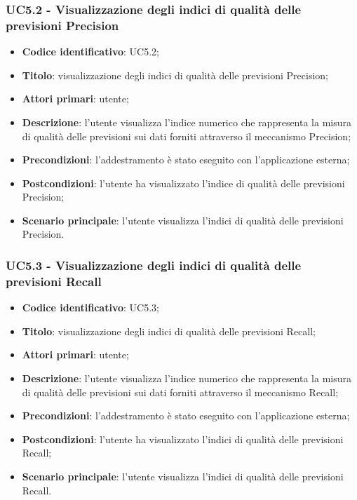 \subsubsection{UC5.2 - Visualizzazione degli indici di qualità delle previsioni Precision}
\begin{itemize}
	\item \textbf{Codice identificativo}: UC5.2;
	\item \textbf{Titolo}: visualizzazione degli indici di qualità delle previsioni Precision\glo;
	\item \textbf{Attori primari}: utente;
	\item \textbf{Descrizione}: l'utente visualizza l'indice numerico che rappresenta la misura di qualità delle previsioni sui dati forniti attraverso il meccanismo Precision\glo;
	\item \textbf{Precondizioni}: l'addestramento è stato eseguito con l'applicazione esterna;
	\item \textbf{Postcondizioni}: l'utente ha visualizzato l'indice di qualità delle previsioni Precision\glo;
	\item \textbf{Scenario principale}: l'utente visualizza l'indici di qualità delle previsioni Precision\glo.
\end{itemize} 
\subsubsection{UC5.3 - Visualizzazione degli indici di qualità delle previsioni Recall}
\begin{itemize}
	\item \textbf{Codice identificativo}: UC5.3;
	\item \textbf{Titolo}: visualizzazione degli indici di qualità delle previsioni Recall\glo;
	\item \textbf{Attori primari}: utente;
	\item \textbf{Descrizione}: l'utente visualizza l'indice numerico che rappresenta la misura di qualità delle previsioni sui dati forniti attraverso il meccanismo Recall\glo;
	\item \textbf{Precondizioni}: l'addestramento è stato eseguito con l'applicazione esterna;
	\item \textbf{Postcondizioni}: l'utente ha visualizzato l'indici di qualità delle previsioni Recall\glo;
	\item \textbf{Scenario principale}: l'utente visualizza l'indici di qualità delle previsioni Recall\glo.
\end{itemize} 
